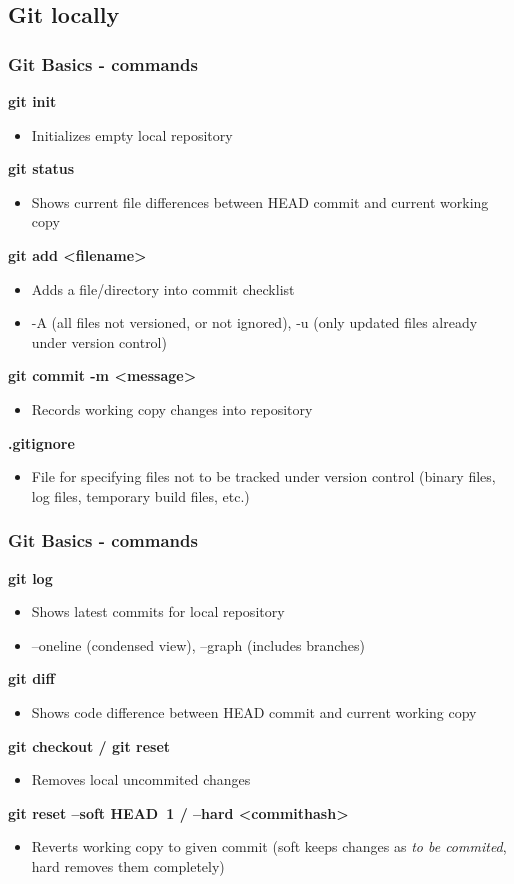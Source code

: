 \subsection[]{Git locally}
\begin{frame}
\frametitle{Git Basics - commands}

\textbf{git init}
	\begin{itemize}
	\item Initializes empty local repository
	\end{itemize}
\textbf{git status}
	\begin{itemize}
	\item Shows current file differences between HEAD commit and current working copy
	\end{itemize}
\textbf{git add <filename>}
	\begin{itemize}
	\item Adds a file/directory into commit checklist
	\item -A (all files not versioned, or not ignored), -u (only updated files already under version control)
	\end{itemize}
\textbf{git commit -m <message>}
	\begin{itemize}
	\item Records working copy changes into repository
	\end{itemize}
\textbf{.gitignore}
	\begin{itemize}
	\item File for specifying files not to be tracked under version control (binary files, log files, temporary build files, etc.)
	\end{itemize}
\end{frame}

\begin{frame}
\frametitle{Git Basics - commands}

\textbf{git log}
	\begin{itemize}
	\item Shows latest commits for local repository
	\item --oneline (condensed view), --graph (includes branches)
	\end{itemize}
\textbf{git diff}
	\begin{itemize}
	\item Shows code difference between HEAD commit and current working copy
	\end{itemize}
\textbf{git checkout / git reset}
	\begin{itemize}
	\item Removes local uncommited changes
	\end{itemize}
\textbf{git reset --soft HEAD~1 / --hard <commithash>}
	\begin{itemize}
	\item Reverts working copy to given commit (soft keeps changes as \emph{to be commited}, hard removes them completely)
	\end{itemize}
\end{frame}

